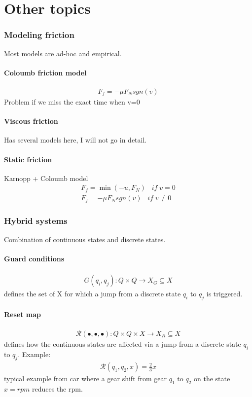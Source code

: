 \part{Other topics}
\section{Modeling friction}
Most models are ad-hoc and empirical. 
\subsection{Coloumb friction model}
\begin{align}
    F_f = -\mu F_N sgn(v)
\end{align}
Problem if we miss the exact time when v=0

\subsection{Viscous friction}
Has several models here, I will not go in detail.

\subsection{Static friction}
Karnopp + Coloumb model
\begin{align}
    F_f = \min(-u,F_N) \;\;\; if \; v=0 \\
    F_f = -\mu F_N sgn(v) \;\;\; if \; v\neq0
\end{align}

\section{Hybrid systems}
Combination of continuous states and discrete states.

\subsection{Guard conditions}
\begin{align}
    G(q_i,q_j): Q \times Q \rightarrow X_G\subseteq X
\end{align}
defines the set of X for which a jump from a discrete state $q_i$ to $q_j$ is triggered.

\subsection{Reset map}
\begin{align}
    \mathcal{R}(\bullet,\bullet,\bullet): Q \times Q \times X \rightarrow X_R \subseteq X
\end{align}
defines how the continuous states are affected via a jump from a discrete state $q_i$ to $q_j$. Example:
\begin{align}
    \mathcal{R}(q_1,q_2,x) = \frac{2}{3} x
\end{align}
typical example from car where a gear shift from gear $q_1$ to $q_2$ on the state $x=rpm$ reduces the rpm.

